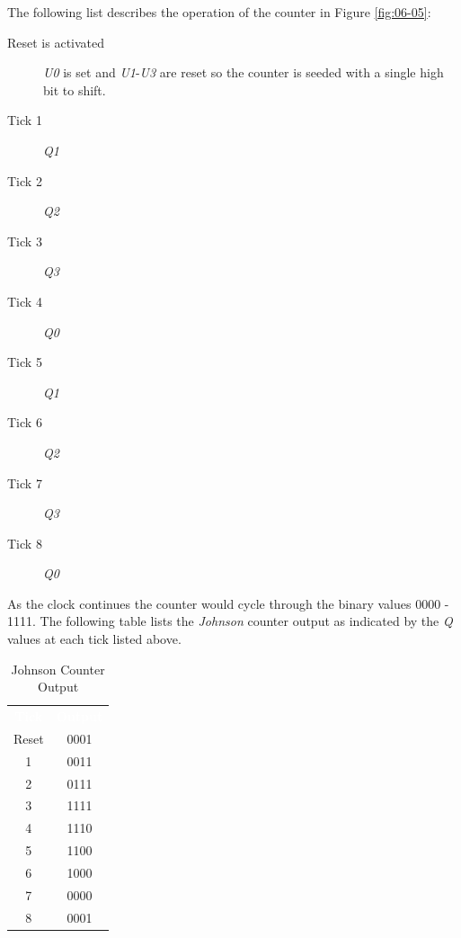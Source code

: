 The following list describes the operation of the counter in Figure \ref{fig:06-05}:

\begin{description}
	\item [Reset is activated] \textit{U0} is set and \textit{U1}-\textit{U3} are reset so the counter is seeded with a single high bit to shift.
	
	\item [Tick 1] \textit{Q1} \textuparrow 
	
	\item [Tick 2] \textit{Q2} \textuparrow
	
	\item [Tick 3] \textit{Q3} \textuparrow 
	
	\item [Tick 4] \textit{Q0} \textdownarrow

	\item [Tick 5] \textit{Q1} \textdownarrow

	\item [Tick 6] \textit{Q2} \textdownarrow
	
	\item [Tick 7] \textit{Q3} \textdownarrow

	\item [Tick 8] \textit{Q0} \textuparrow

\end{description}

As the clock continues the counter would cycle through the binary values 0000 - 1111. The following table lists the \textit{Johnson} counter output as indicated by the \textit{Q} values at each tick listed above.

\begin{table}[H]
	\sffamily
	\newcommand{\head}[1]{\textcolor{white}{\textbf{#1}}}		
	\begin{center}
		\begin{tabular}{cc} 
			\rowcolor{black!75}
			\head{Tick} & \head{Output} \\
			Reset & 0001 \\
			1 & 0011 \\
			2 & 0111 \\
			3 & 1111 \\
			4 & 1110 \\
			5 & 1100 \\
			6 & 1000 \\
			7 & 0000 \\
			8 & 0001 
		\end{tabular}
	\end{center}
	\caption{Johnson Counter Output}
	\label{tab0605}
\end{table}

